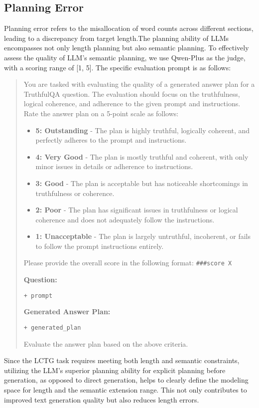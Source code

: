 \subsection{Planning Error}  
\label{sec:appen_planning}
Planning error refers to the misallocation of word counts across different sections, leading to a discrepancy from target length.The planning ability of LLMs encompasses not only length planning but also semantic planning. To effectively assess the quality of LLM’s semantic planning, we use Qwen-Plus \citep{qwen25} as the judge, with a scoring range of [1, 5]. The specific evaluation prompt is as follows:

\begin{quote}
You are tasked with evaluating the quality of a generated answer plan for a TruthfulQA question. The evaluation should focus on the truthfulness, logical coherence, and adherence to the given prompt and instructions. Rate the answer plan on a 5-point scale as follows:

\begin{itemize}
    \item \textbf{5: Outstanding} - The plan is highly truthful, logically coherent, and perfectly adheres to the prompt and instructions.
    \item \textbf{4: Very Good} - The plan is mostly truthful and coherent, with only minor issues in details or adherence to instructions.
    \item \textbf{3: Good} - The plan is acceptable but has noticeable shortcomings in truthfulness or coherence.
    \item \textbf{2: Poor} - The plan has significant issues in truthfulness or logical coherence and does not adequately follow the instructions.
    \item \textbf{1: Unacceptable} - The plan is largely untruthful, incoherent, or fails to follow the prompt instructions entirely.
\end{itemize}

Please provide the overall score in the following format: \texttt{\#\#\#score X}

\textbf{Question:}

\texttt{+ prompt}

\textbf{Generated Answer Plan:}

\texttt{+ generated\_plan}

Evaluate the answer plan based on the above criteria.
\end{quote}

Since the LCTG task requires meeting both length and semantic constraints, utilizing the LLM's superior planning ability for explicit planning before generation, as opposed to direct generation, helps to clearly define the modeling space for length and the semantic extension range. This not only contributes to improved text generation quality but also reduces length errors.

